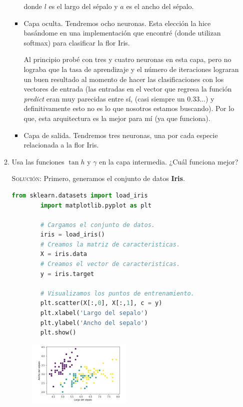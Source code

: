 \documentclass[letterpaper,11pt]{article}
\begin{document}
\begin{enumerate}
\begin{enumerate}
\begin{itemize}
            donde $l$ es el largo del sépalo y $a$ es el ancho del sépalo.
            
            \item Capa oculta.
            Tendremos ocho neuronas. Esta elección la hice basándome en una 
            implementación que encontré (donde utilizan softmax) para clasificar 
            la flor Iris. 
            
            Al principio probé con tres y cuatro neuronas en esta capa, pero no
            lograba que la tasa de aprendizaje y el número de iteraciones 
            lograran un buen resultado al momento de hacer las clasificaciones
            con los vectores de entrada (las entradas en el vector que regresa
            la función \textit{predict} eran muy parecidas entre sí, (casi 
            siempre un $0.33...$) y definitivamente esto no es lo que nosotros
            estamos buscando). Por lo que, esta arquitectura es la mejor para mí 
            (ya que funciona). 

            \item Capa de salida.
            Tendremos tres neuronas, una por cada especie relacionada a la flor
            Iris.
        \end{itemize}
        
        \item Usa las funciones $\tan h$ y $\gamma$ en la capa intermedia. ¿Cuál
        funciona mejor?

        \textsc{Solución:} Primero, generamos el conjunto de datos \textbf{Iris}.
        \begin{lstlisting}[language=Python]
        from sklearn.datasets import load_iris
        import matplotlib.pyplot as plt 

        # Cargamos el conjunto de datos. 
        iris = load_iris()
        # Creamos la matriz de caracteristicas.
        X = iris.data
        # Creamos el vector de caracteristicas.
        y = iris.target

        # Visualizamos los puntos de entrenamiento.
        plt.scatter(X[:,0], X[:,1], c = y)
        plt.xlabel('Largo del sepalo')
        plt.ylabel('Ancho del sepalo')
        plt.show()
        \end{lstlisting}

        \begin{figure}[ht]
            \centering
            \includegraphics[width=0.5\textwidth]{./imagenes/iris.png}
        \end{figure}


\end{enumerate}
\end{enumerate}
\end{document}
